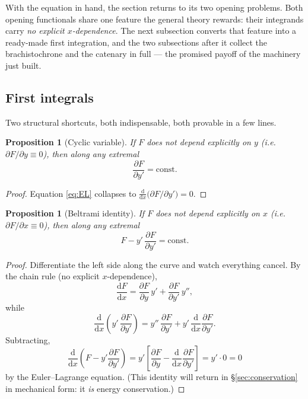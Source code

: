 \documentclass[11pt]{article}
\theoremstyle{plain}
\newtheorem{proposition}[theorem]{Proposition}
\theoremstyle{definition}
\theoremstyle{remark}
\newcommand{\dd}{\mathrm{d}}
\newcommand{\pd}[2]{\frac{\partial #1}{\partial #2}}
\begin{document}
With the equation in hand, the section returns to its two opening
problems. Both opening functionals share one feature the general theory
rewards: their integrands carry \emph{no explicit
$x$-dependence}. The next subsection converts that feature into a
ready-made first integration, and the two subsections after it collect
the brachistochrone and the catenary in full --- the promised payoff of
the machinery just built.

\subsection{First integrals}
\label{sec:first-integrals}

Two structural shortcuts, both indispensable, both provable in a few lines.

\begin{proposition}[Cyclic variable]\label{prop:cyclic}
If $F$ does not depend explicitly on $y$ (i.e.\ $\partial F/\partial y
\equiv 0$), then along any extremal
\begin{equation}
  \pd{F}{y'} = \text{const}.
\end{equation}
\end{proposition}
\begin{proof}
Equation \eqref{eq:EL} collapses to
$\tfrac{\dd}{\dd x}\bigl(\partial F/\partial y'\bigr) = 0$.
\end{proof}

\begin{proposition}[Beltrami identity]\label{prop:beltrami}
If $F$ does not depend explicitly on $x$ (i.e.\ $\partial F/\partial x
\equiv 0$), then along any extremal
\begin{equation}
  \boxed{\;
  F - y'\,\pd{F}{y'} = \text{const}.
  \;}
  \label{eq:beltrami}
\end{equation}
\end{proposition}
\begin{proof}
Differentiate the left side along the curve and watch everything cancel.
By the chain rule (no explicit $x$-dependence),
\begin{equation}
  \frac{\dd F}{\dd x}
  = \pd{F}{y}\,y' + \pd{F}{y'}\,y'' ,
\end{equation}
while
\begin{equation}
  \frac{\dd}{\dd x}\left(y'\,\pd{F}{y'}\right)
  = y''\,\pd{F}{y'} + y'\,\frac{\dd}{\dd x}\pd{F}{y'} .
\end{equation}
Subtracting,
\begin{equation}
  \frac{\dd}{\dd x}\left(F - y'\pd{F}{y'}\right)
  = y'\left[\pd{F}{y} - \frac{\dd}{\dd x}\pd{F}{y'}\right]
  = y' \cdot 0 = 0
\end{equation}
by the Euler--Lagrange equation. (This identity will return in
\S\ref{sec:conservation} in mechanical form: it \emph{is} energy
conservation.)
\end{proof}
\end{document}
